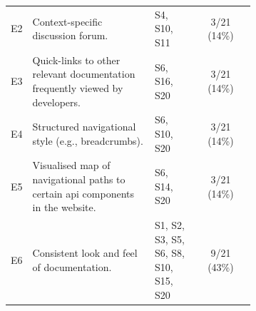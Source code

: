 \begin{small}
\begin{longtable}{rp{0.5\linewidth}|p{0.175\linewidth}|c}
  E2&
  Context-specific discussion forum.
  &
  S4, S10, S11 &
  3/21 (14\%)\\

  E3&
  Quick-links to other relevant documentation frequently viewed by developers.
  &
  S6, S16, S20 &
  3/21 (14\%)\\

  E4&
  Structured navigational style (e.g., breadcrumbs).
  &
  S6, S10, S20 &
  3/21 (14\%)\\

  E5&
  Visualised map of navigational paths to certain \gls{api} components in the website.
  &
  S6, S14, S20 &
  3/21 (14\%)\\

  {E6}&
  {Consistent look and feel of documentation.}
  &
  {S1, S2, S3, S5, S6, S8, S10, S15, S20} &
  {9/21 (43\%)}\\
\end{longtable}
\end{small}